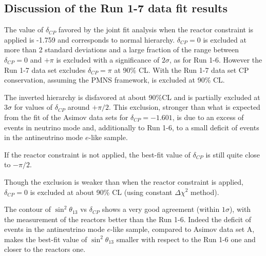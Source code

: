 %
%

\subsection {Discussion of the Run 1-7 data fit results}
\label{sec:results_discussion_run17}

The value of $\delta_{CP}$ favored by the joint fit analysis when the reactor constraint is applied 
is -1.759 and corresponds to normal hierarchy.
$\delta_{CP} = 0$ is excluded at more than 2 standard deviations and a large fraction of the range between $\delta_{CP} = 0$ and $+\pi$
is excluded with a significance of $2 \sigma$, as for Run 1-6.
However the Run 1-7 data set excludes $\delta_{CP} = \pi$ at 90\% CL.
With the Run 1-7 data set CP conservation, assuming the PMNS framework, is excluded at 90\% CL. 

The inverted hierarchy is disfavored at about 90\%CL and is partially 
excluded at $3\sigma$ for values of $\delta_{CP}$ around $+\pi/2$.
This exclusion, stronger than what is expected from the fit of the Asimov data sets for $\delta_{CP}=-1.601$,
is due to an excess of events in neutrino mode and, additionally to Run 1-6, 
to a small deficit of events in the antineutrino mode $e$-like sample.

If the reactor constraint is not applied, the best-fit value of $\delta_{CP}$ is still quite close to $-\pi/2$.

Though the exclusion is weaker than when the reactor constraint is applied,
$\delta_{CP}=0$ is excluded at about 90\% CL (using constant $\Delta \chi^2$ method).

The contour of $\sin^2 \theta_{13}$ vs $\delta_{CP}$ shows a very good agreement (within $1 \sigma$),
with the measurement of the reactors better than the Run 1-6.
Indeed the deficit of events in the antineutrino mode $e$-like sample, compared to Asimov data set A,
makes the best-fit value of $\sin^2 \theta_{13}$ smaller with respect to the Run 1-6 one and closer to the reactors one.


\clearpage




